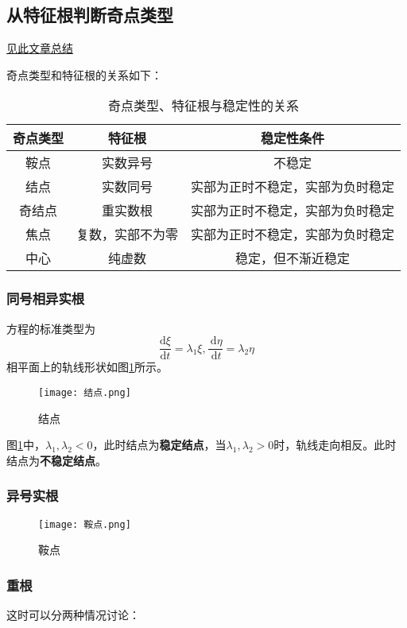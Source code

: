 \subsection{从特征根判断奇点类型}
\href{https://zhuanlan.zhihu.com/p/307458958}{见此文章总结}

奇点类型和特征根的关系如下：
\begin{table*}[ht!]
    \centering
    \begin{tabular}{ccc}
        \toprule
        奇点类型 & 特征根      & 稳定性条件            \\
        \midrule
        鞍点   & 实数异号     & 不稳定              \\
        结点   & 实数同号     & 实部为正时不稳定，实部为负时稳定 \\
        奇结点  & 重实数根     & 实部为正时不稳定，实部为负时稳定 \\
        焦点   & 复数，实部不为零 & 实部为正时不稳定，实部为负时稳定 \\
        中心   & 纯虚数      & 稳定，但不渐近稳定        \\
        \bottomrule
    \end{tabular}
    \caption{奇点类型、特征根与稳定性的关系}
    \label{tab:奇点类型与特征根的关系}
\end{table*}

\subsubsection{同号相异实根}
方程的标准类型为
$$\frac{\mathrm{d} \xi}{\mathrm{d} t}=\lambda_1 \xi, \frac{\mathrm{~d} \eta}{\mathrm{~d} t}=\lambda_2 \eta$$
相平面上的轨线形状如图\ref{fig:结点}所示。
\begin{figure}[h]
    \centering
    \texttt{[image: 结点.png]}
    \caption{结点}
    \label{fig:结点}
\end{figure}
图\ref{fig:结点}中，$\lambda_1,\lambda_2<0$，此时结点为\textbf{稳定结点}，当$\lambda_1,\lambda_2>0$时，轨线走向相反。此时结点为\textbf{不稳定结点}。
\subsubsection{异号实根}

\begin{figure}[H]
    \centering
    \texttt{[image: 鞍点.png]}
    \caption{鞍点}
    \label{fig:鞍点}
\end{figure}

\subsubsection{重根}
这时可以分两种情况讨论：

